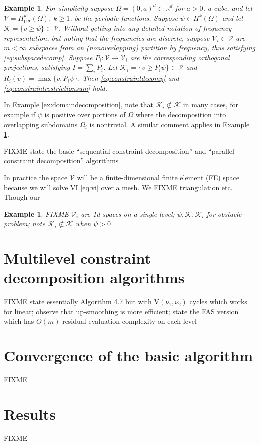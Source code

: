 \documentclass[letterpaper,final,12pt,reqno]{amsart}
\theoremstyle{cstyle}
\theoremstyle{dstyle}
\newtheorem{example}[theorem]{Example}
\numberwithin{equation}{section}
\numberwithin{figure}{section}
\numberwithin{table}{section}
\numberwithin{theorem}{section}
\newcommand{\RR}{\mathbb{R}}
\newcommand{\cK}{\mathcal{K}}
\newcommand{\cV}{\mathcal{V}}
\begin{document}
\begin{example}  \label{ex:frequencydecomposition}  For simplicity suppose $\Omega = (0,a)^d \subset \RR^d$ for $a>0$, a cube, and let $\cV = H_{\text{per}}^k(\Omega)$, $k\ge 1$, be the periodic functions.  Suppose $\psi \in H^k(\Omega)$ and let $\cK = \{v \ge \psi\} \subset \cV$.  Without getting into any detailed notation of frequency representation, but noting that the frequencies are discrete, suppose $\cV_i \subset \cV$ are $m<\infty$ subspaces from an (nonoverlapping) partition by frequency, thus satisfying \eqref{eq:subspacedecomp}.  Suppose $P_i:\cV \to \cV_i$ are the corresponding orthogonal projections, satisfying $I = \sum_i P_i$.  Let $\cK_i = \{v \ge P_i \psi\} \subset \cV$ and $R_i(v) = \max\{v,P_i \psi\}$.  Then \eqref{eq:constraintdecomp} and \eqref{eq:constraintrestrictionsum} hold.
\end{example}

In Example \ref{ex:domaindecomposition}, note that $\cK_i \not\subset \cK$ in many cases, for example if $\psi$ is positive over portions of $\Omega$ where the decomposition into overlapping subdomains $\Omega_i$ is nontrivial.  A similar comment applies in Example \ref{ex:frequencydecomposition}.


FIXME state the basic ``sequential constraint decomposition'' and ``parallel constraint decomposition'' algorithms

In practice the space $\cV$ will be a finite-dimensional finite element (FE) space because we will solve VI \eqref{eq:vi} over a mesh.  We FIXME triangulation etc. Though our 

\begin{example}  FIXME $\cV_i$ are 1d spaces on a single level; $\psi,\cK,\cK_i$ for obstacle problem; note $\cK_i \not\subset \cK$ when $\psi>0$
\end{example}


\section{Multilevel constraint decomposition algorithms} \label{sec:multilevel}

FIXME state essentially Algorithm 4.7 \cite{GraeserKornhuber2009} but with $\text{V}(\nu_1,\nu_2)$ cycles which works for linear; observe that up-smoothing is more efficient; state the FAS version which has $O(m)$ residual evaluation complexity on each level


\section{Convergence of the basic algorithm} \label{sec:convergence}

FIXME


\section{Results} \label{sec:results}

FIXME


\small

\bigskip


\end{document}
